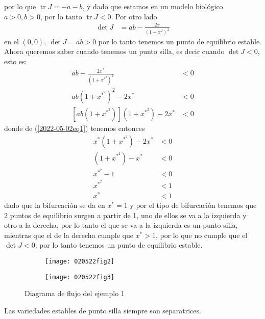 \begin{ejemplo}
\begin{equation*}
	\end{equation*}
	por lo que $\operatorname{tr}J = -a-b$, y dado que estamos en un modelo biológico $a>0,b>0$, por lo tanto  $\operatorname{tr}J<0$. Por otro lado
	\begin{align*}
	  \operatorname{det}J &= ab - \frac{2x}{(1+x^2)^2} 
	\end{align*}
	en el $(0,0),\ \operatorname{det} J = ab>0$ por lo tanto tenemos un punto de equilibrio estable. Ahora queremos saber cuando tenemos un punto silla, es decir cuando $ \operatorname{det} J < 0$, esto es:
	\begin{align*}
		ab - \frac{2x^*}{(1+x^{{*}^2})^2} &< 0 \\
		ab(1+x^{{*}^2})^2 - 2x^* &< 0  \\
		[ab(1+x^{{*}^2})](1+x^{{*}^2})-2x^* &< 0 
	\end{align*}
	donde de (\ref{2022-05-02eq1}) tenemos entonces
	\begin{equation*}
		\begin{split}
			x^*(1+x^{{*}^2})-2x^* &< 0 \\
			(1+x^{{*}^2})-x^* &< 0 \\
			x^{{*}^2} - 1 &< 0 \\
			x^{{*}^2} &< 1 \\
			x^* &< 1 
		\end{split}
	\end{equation*}
	dado que la bifurcación se da en $x^*=1$ y por el tipo de bifurcación tenemos que 2 puntos de equilibrio surgen a partir de 1, uno de ellos se va a la izquierda y otro a la derecha, por lo tanto el que se va a la izquierda es un punto silla, mientras que el de la derecha cumple que $x^*>1$, por lo que no cumple que el $ \operatorname{det} J <0$; por lo tanto tenemos un punto de equilibrio estable.
  
	\begin{figure}[H]
	  \begin{subfigure}[b]{0.49\textwidth}
	    \texttt{[image: 020522fig2]}
	  \end{subfigure}
	  \hfill
	  \begin{subfigure}[b]{0.49\textwidth}
	    \texttt{[image: 020522fig3]}
	  \end{subfigure}
	  \caption{Diagrama de flujo del ejemplo 1}
	\end{figure}

	\begin{tcolorbox}[colback=Black!4, colframe=White, arc=2mm]
	\begin{nota}
		Las variedades estables de punto silla siempre son separatrices.
	\end{nota}
	\end{tcolorbox}
\end{ejemplo}

